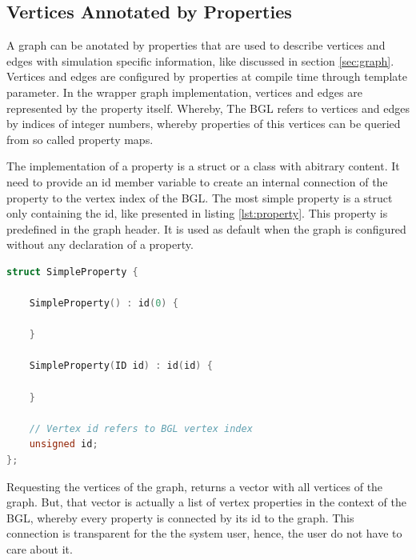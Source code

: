 \subsection{Vertices Annotated by Properties}

A graph can be anotated by properties that are used to describe
vertices and edges with simulation specific information, like
discussed in section \ref{sec:graph}. Vertices and edges are
configured by properties at compile time through template
parameter. In the wrapper graph implementation, vertices and edges are
represented by the property itself. Whereby, The BGL refers to
vertices and edges by indices of integer numbers, whereby properties
of this vertices can be queried from so called property maps.

The implementation of a property is a struct or a class with abitrary content. It need
to provide an id member variable to create an internal connection of
the property to the vertex index of the BGL.  The most simple property
is a struct only containing the id, like presented in listing
\ref{lst:property}. This property is predefined in the graph
header. It is used as default when the graph is configured without any
declaration of a property.

\begin{lstlisting}[language=C++, label=lst:property]
struct SimpleProperty {

    SimpleProperty() : id(0) {

    }
    
    SimpleProperty(ID id) : id(id) {

    }

    // Vertex id refers to BGL vertex index
    unsigned id;
};
\end{lstlisting}

Requesting the vertices of the graph, returns a vector with all
vertices of the graph. But, that vector is actually a list of vertex
properties in the context of the BGL, whereby every property is
connected by its id to the graph. This connection is transparent for
the the system user, hence, the user do not have to care about it.

